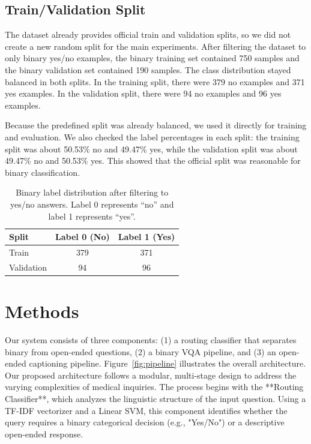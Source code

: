 \documentclass{article}
\begin{document}
\subsection{Train/Validation Split}

The dataset already provides official train and validation splits, so we did not
create a new random split for the main experiments. After filtering the dataset
to only binary yes/no examples, the binary training set contained 750 samples and
the binary validation set contained 190 samples. The class distribution stayed
balanced in both splits. In the training split, there were 379 no examples and
371 yes examples. In the validation split, there were 94 no examples and 96 yes
examples.

Because the predefined split was already balanced, we used it directly for
training and evaluation. We also checked the label percentages in each split:
the training split was about 50.53\% no and 49.47\% yes, while the validation
split was about 49.47\% no and 50.53\% yes. This showed that the official split
was reasonable for binary classification.

\begin{table}[h]
    \centering
    \caption{Binary label distribution after filtering to yes/no answers. Label 0 represents ``no'' and label 1 represents ``yes''.}
    \label{tab:binary-split-distribution}
    \begin{tabular}{lcc}
        \hline
        Split & Label 0 (No) & Label 1 (Yes) \\
        \hline
        Train & 379 & 371 \\
        Validation & 94 & 96 \\
        \hline
    \end{tabular}
\end{table}


\section{Methods}

Our system consists of three components: (1) a routing classifier that
separates binary from open-ended questions, (2) a binary VQA pipeline, and
(3) an open-ended captioning pipeline. Figure~\ref{fig:pipeline} illustrates
the overall architecture.
Our proposed architecture follows a modular, multi-stage design to address the varying complexities of medical inquiries. The process begins with the **Routing Classifier**, which analyzes the linguistic structure of the input question. Using a TF-IDF vectorizer and a Linear SVM, this component identifies whether the query requires a binary categorical decision (e.g., "Yes/No") or a descriptive open-ended response. 
\end{document}
